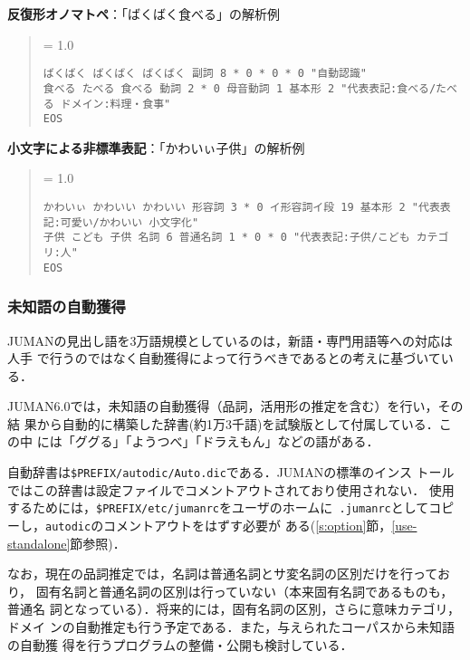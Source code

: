 \documentclass[a4j,titlepage]{jarticle}
\begin{document}
\noindent
{\bf 反復形オノマトペ}：「ばくばく食べる」の解析例
\begin{quote}
{\baselineskip = 1.0 \baselineskip
\begin{verbatim}
ばくばく ばくばく ばくばく 副詞 8 * 0 * 0 * 0 "自動認識"
食べる たべる 食べる 動詞 2 * 0 母音動詞 1 基本形 2 "代表表記:食べる/たべる ドメイン:料理・食事"
EOS
\end{verbatim}
}
\end{quote}

\noindent
{\bf 小文字による非標準表記}：「かわいぃ子供」の解析例
\begin{quote}
{\baselineskip = 1.0 \baselineskip
\begin{verbatim}
かわいぃ かわいい かわいい 形容詞 3 * 0 イ形容詞イ段 19 基本形 2 "代表表記:可愛い/かわいい 小文字化"
子供 こども 子供 名詞 6 普通名詞 1 * 0 * 0 "代表表記:子供/こども カテゴリ:人"
EOS
\end{verbatim}
}
\end{quote}

\subsubsection{未知語の自動獲得}

JUMANの見出し語を3万語規模としているのは，新語・専門用語等への対応は人手
で行うのではなく自動獲得によって行うべきであるとの考えに基づいている．

JUMAN6.0では，未知語の自動獲得（品詞，活用形の推定を含む）を行い，その結
果から自動的に構築した辞書(約1万3千語)を試験版として付属している．この中
には「ググる」「ようつべ」「ドラえもん」などの語がある．

自動辞書は\texttt{\$PREFIX/autodic/Auto.dic}である．JUMANの標準のインス
トールではこの辞書は設定ファイルでコメントアウトされており使用されない．
使用するためには，\texttt{\$PREFIX/etc/jumanrc}をユーザのホームに{\tt
.jumanrc}としてコピーし，\texttt{autodic}のコメントアウトをはずす必要が
ある(\ref{s:option}節，\ref{use-standalone}節参照)．

なお，現在の品詞推定では，名詞は普通名詞とサ変名詞の区別だけを行っており，
固有名詞と普通名詞の区別は行っていない（本来固有名詞であるものも，普通名
詞となっている）．将来的には，固有名詞の区別，さらに意味カテゴリ，ドメイ
ンの自動推定も行う予定である．また，与えられたコーパスから未知語の自動獲
得を行うプログラムの整備・公開も検討している．
\end{document}
